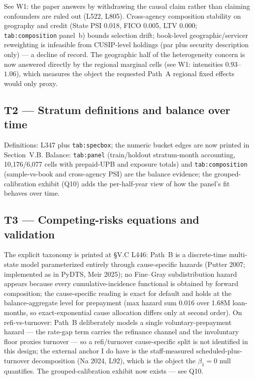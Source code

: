 \documentclass[11pt]{article}
\newcommand{\mlabel}[1]{\texttt{#1}}
\begin{document}
See W1: the paper answers by withdrawing the causal claim rather than claiming
confounders are ruled out (L522, L805). Cross-agency composition stability on
geography and credit (State PSI 0.018, FICO 0.005, LTV 0.000;
\mlabel{tab:composition} panel~b) bounds selection drift; book-level
geographic/servicer reweighting is infeasible from CUSIP-level holdings (par
plus security description only) --- a decline of record. The geographic half
of the heterogeneity concern is now answered directly by the regional marginal
cells (see W1: intensities $0.93$--$1.06$), which measures the object the
requested Path~A regional fixed effects would only proxy.

\subsection*{T2 --- Stratum definitions and balance over time}

Definitions: L347 plus \mlabel{tab:specbox}; the numeric bucket edges are now
printed in Section~V.B. Balance: \mlabel{tab:panel} (train/holdout
stratum-month accounting, 10,176/6,077 cells with prepaid-UPB and exposure
totals) and \mlabel{tab:composition} (sample-vs-book and cross-agency PSI) are
the balance evidence; the grouped-calibration exhibit (Q10) adds the
per-half-year view of how the panel's fit behaves over time.

\subsection*{T3 --- Competing-risks equations and validation}

The explicit taxonomy is printed at \S V.C L446: Path~B is a discrete-time
multi-state model parameterized entirely through cause-specific hazards
(Putter 2007; implemented as in PyDTS, Meir 2025); no Fine--Gray
subdistribution hazard appears because every cumulative-incidence functional
is obtained by forward composition; the cause-specific reading is exact for
default and holds at the balance-aggregate level for prepayment (max hazard
sum 0.016 over 1.68M loan-months, so exact-exponential cause allocation
differs only at second order). On refi-vs-turnover: Path~B deliberately models
a single voluntary-prepayment hazard --- the rate-gap term carries the
refinance channel and the involuntary floor proxies turnover --- so a
refi/turnover cause-specific split is not identified in this design; the
external anchor I do have is the staff-measured scheduled-plus-turnover
decomposition (Na 2024, L92), which is the object the $\beta_1=0$ null
quantifies. The grouped-calibration exhibit now exists --- see Q10.
\end{document}
